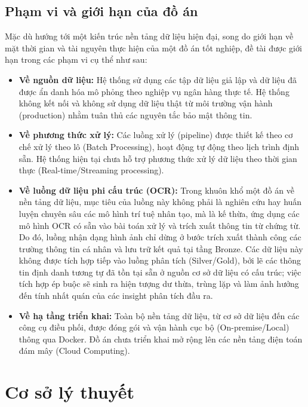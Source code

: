 \subsection{Phạm vi và giới hạn của đồ án}
Mặc dù hướng tới một kiến trúc nền tảng dữ liệu hiện đại, song do giới hạn về mặt thời gian và tài nguyên thực hiện của một đồ án tốt nghiệp, đề tài được giới hạn trong các phạm vi cụ thể như sau:
\begin{itemize}
    \item \textbf{Về nguồn dữ liệu:} Hệ thống sử dụng các tập dữ liệu giả lập và dữ liệu đã được ẩn danh hóa mô phỏng theo nghiệp vụ ngân hàng thực tế. Hệ thống không kết nối và không sử dụng dữ liệu thật từ môi trường vận hành (production) nhằm tuân thủ các nguyên tắc bảo mật thông tin.
    \item \textbf{Về phương thức xử lý:} Các luồng xử lý (pipeline) được thiết kế theo cơ chế xử lý theo lô (Batch Processing), hoạt động tự động theo lịch trình định sẵn. Hệ thống hiện tại chưa hỗ trợ phương thức xử lý dữ liệu theo thời gian thực (Real-time/Streaming processing).
    \item \textbf{Về luồng dữ liệu phi cấu trúc (OCR):} Trong khuôn khổ một đồ án về nền tảng dữ liệu, mục tiêu của luồng này không phải là nghiên cứu hay huấn luyện chuyên sâu các mô hình trí tuệ nhân tạo, mà là kế thừa, ứng dụng các mô hình OCR có sẵn vào bài toán xử lý và trích xuất thông tin từ chứng từ. Do đó, luồng nhận dạng hình ảnh chỉ dừng ở bước trích xuất thành công các trường thông tin cá nhân và lưu trữ kết quả tại tầng Bronze. Các dữ liệu này không được tích hợp tiếp vào luồng phân tích (Silver/Gold), bởi lẽ các thông tin định danh tương tự đã tồn tại sẵn ở nguồn cơ sở dữ liệu có cấu trúc; việc tích hợp ép buộc sẽ sinh ra hiện tượng dư thừa, trùng lặp và làm ảnh hưởng đến tính nhất quán của các insight phân tích đầu ra.

    \item \textbf{Về hạ tầng triển khai:} Toàn bộ nền tảng dữ liệu, từ cơ sở dữ liệu đến các công cụ điều phối, được đóng gói và vận hành cục bộ (On-premise/Local) thông qua Docker. Đồ án chưa triển khai mở rộng lên các nền tảng điện toán đám mây (Cloud Computing).
\end{itemize}

\section{Cơ sở lý thuyết}
\label{sec:background}

